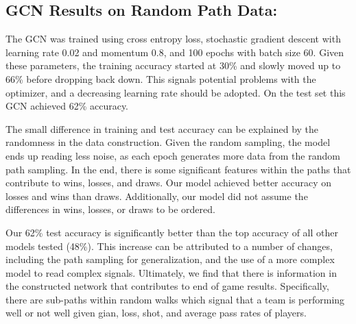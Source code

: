 \subsection{GCN Results on Random Path Data:}

The GCN was trained using cross entropy loss, stochastic gradient descent with learning rate 0.02 and momentum 0.8, and 100 epochs with batch size 60. Given these parameters, the training accuracy started at 30\% and slowly moved up to 66\% before dropping back down. This signals potential problems with the optimizer, and a decreasing learning rate should be adopted. On the test set this GCN achieved 62\% accuracy. 

The small difference in training and test accuracy can be explained by the randomness in the data construction. Given the random sampling, the model ends up reading less noise, as each epoch generates more data from the random path sampling. In the end, there is some significant features within the paths that contribute to wins, losses, and draws. Our model achieved better accuracy on losses and wins than draws. Additionally, our model did not assume the differences in wins, losses, or draws to be ordered. 

Our 62\% test accuracy is significantly better than the top accuracy of all other models tested (48\%). This increase can be attributed to a number of changes, including the path sampling for generalization, and the use of a more complex model to read complex signals. Ultimately, we find that there is information in the constructed network that contributes to end of game results. Specifically, there are sub-paths within random walks which signal that a team is performing well or not well given gian, loss, shot, and average pass rates of players. 



